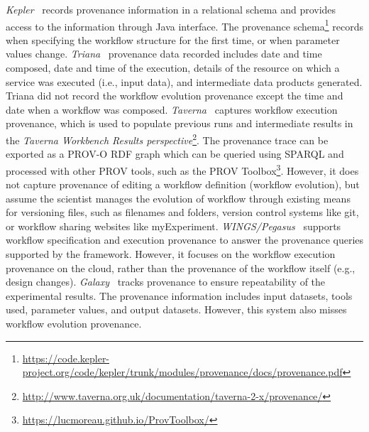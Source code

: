 \documentclass[ao]{iosart2x}
\begin{document}
\textit{Kepler}~\citep{altintas2006provenance} records provenance information in a relational schema and provides access to the information through Java interface. The provenance schema\footnote{\url{https://code.kepler-project.org/code/kepler/trunk/modules/provenance/docs/provenance.pdf}} records %
when specifying the workflow structure for the first time, or when parameter values change.
\textit{Triana}~\citep{majithia2004triana} provenance data recorded includes date and time composed, date and time of the execution, details of the resource on which a service was executed (i.e., input data), and intermediate data products generated. Triana did not record the workflow evolution provenance except the time and date when a workflow was composed. 
\textit{Taverna}~\citep{oinn2004taverna} captures workflow execution provenance, which is used to populate previous runs and intermediate results in the \textit{Taverna Workbench Results perspective}\footnote{\url{http://www.taverna.org.uk/documentation/taverna-2-x/provenance/}}. The provenance trace can be exported as a PROV-O RDF graph which can be queried using SPARQL and processed with other PROV tools, such as the PROV Toolbox\footnote{\url{https://lucmoreau.github.io/ProvToolbox/}}. However, it does not capture provenance of editing a workflow definition (workflow evolution), but assume the scientist manages the evolution of workflow through existing means for versioning files, such as filenames and folders, version control systems like git, or workflow sharing websites like myExperiment.
\textit{WINGS/Pegasus}~\citep{kim2008provenance} supports workflow specification and execution provenance to answer the provenance queries supported by the framework. However, it focuses on the workflow execution provenance on the cloud, rather than the provenance of the workflow itself (e.g., design changes).
\textit{Galaxy}~\citep{goecks2010galaxy} tracks provenance to ensure repeatability of the experimental results. The provenance information includes input datasets, tools used, parameter values, and output datasets. However, this system also misses workflow evolution provenance. 
\end{document}
